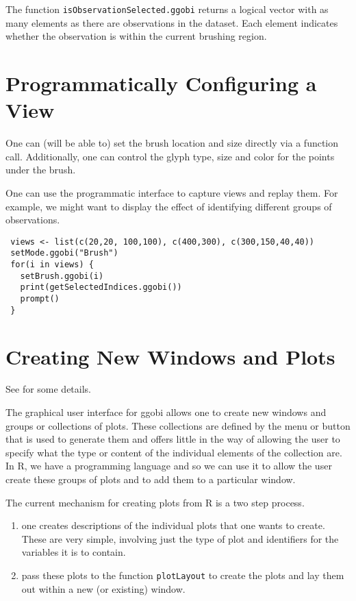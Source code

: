 \documentclass{article}
\def\SFunction#1{{\texttt{\red #1}}}
\begin{document}
The function \SFunction{isObservationSelected.ggobi} returns a logical
vector with as many elements as there are observations in the dataset.
Each element indicates whether the observation is within the current
brushing region.




\section{Programmatically Configuring a View} 
One can (will be able to) set the brush location and size directly via
a function call.  Additionally, one can control the glyph type, size
and color for the points under the brush.

One can use the programmatic interface to capture views and replay
them.  For example, we might want to display the effect of identifying
different groups of observations.
\begin{verbatim}
 views <- list(c(20,20, 100,100), c(400,300), c(300,150,40,40))
 setMode.ggobi("Brush")
 for(i in views) {
   setBrush.ggobi(i)
   print(getSelectedIndices.ggobi())
   prompt()
 }
\end{verbatim}


\section{Creating New Windows and Plots}
See  for some details.

The graphical user interface for ggobi allows one to create new
windows and groups or collections of plots.  These collections are
defined by the menu or button that is used to generate them and offers
little in the way of allowing the user to specify what the type or
content of the individual elements of the collection are.  In R, we
have a programming language and so we can use it to allow the user
create these groups of plots and to add them to a particular window.


The current mechanism for creating plots from R is a two step process.
\begin{enumerate}
\item one creates descriptions of the individual plots that one
wants to create. These are very simple, involving just the type of
plot and identifiers for the variables it is to contain.
\item pass these plots to the function
\SFunction{plotLayout} to create the plots and lay them out within
a new (or existing) window.
\end{enumerate}
\end{document}
